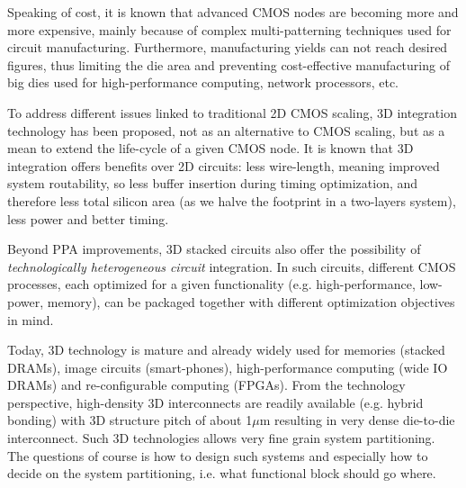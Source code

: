 \documentclass[conference]{IEEEtran}
\begin{document}
Speaking of cost, it is known that advanced CMOS nodes are becoming more and more expensive, mainly because of complex multi-patterning techniques used for circuit manufacturing. Furthermore, manufacturing yields can not reach desired figures, thus limiting the die area and preventing cost-effective manufacturing of big dies used for high-performance computing, network processors, etc. 

To address different issues linked to traditional 2D CMOS scaling, 3D integration technology has been proposed, not as an alternative to CMOS scaling, but as a mean to extend the life-cycle of a given CMOS node. It is known that 3D integration offers benefits over 2D circuits: less wire-length, meaning improved system routability, so less buffer insertion during timing optimization, and therefore less total silicon area (as we halve the footprint in a two-layers system), less power and better timing. 

Beyond PPA improvements, 3D stacked circuits also offer the possibility of \emph{technologically heterogeneous circuit} integration. In such circuits, different CMOS processes, each optimized for a given functionality (e.g. high-performance, low-power, memory), can be packaged together with different optimization objectives in mind. 

Today, 3D technology is mature and already widely used for memories (stacked DRAMs), image circuits (smart-phones), high-performance computing (wide IO DRAMs) and re-configurable computing (FPGAs). From the technology perspective, high-density 3D interconnects are readily available (e.g. hybrid bonding) with 3D structure pitch of about 1$\mu$m resulting in very dense die-to-die interconnect. Such 3D technologies allows very fine grain system partitioning. The questions of course is how to design such systems and especially how to decide on the system partitioning, i.e. what functional block should go where. 

\end{document}
